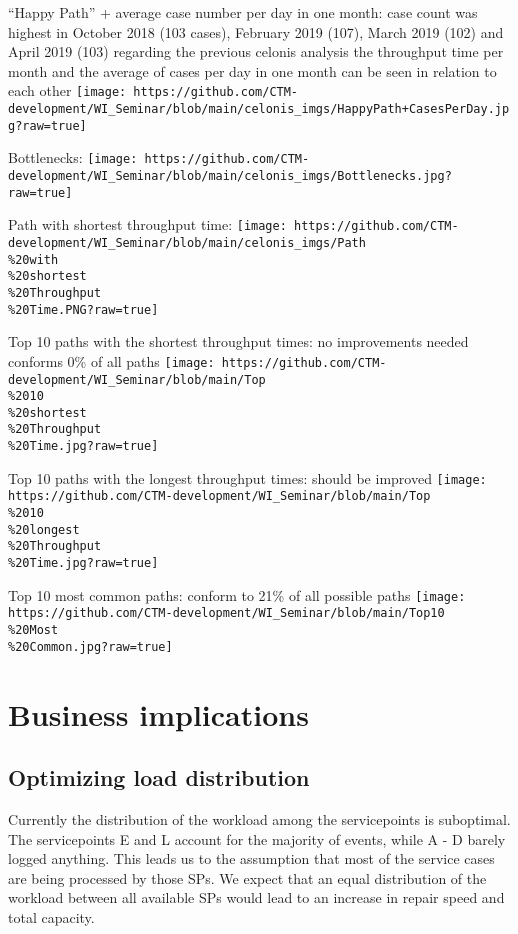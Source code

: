 \documentclass[
]{article}
\begin{document}
``Happy Path'' + average case number per day in one month: case count
was highest in October 2018 (103 cases), February 2019 (107), March 2019
(102) and April 2019 (103) regarding the previous celonis analysis the
throughput time per month and the average of cases per day in one month
can be seen in relation to each other
\texttt{[image: https://github.com/CTM-development/WI\_Seminar/blob/main/celonis\_imgs/HappyPath+CasesPerDay.jpg?raw=true]}

Bottlenecks:
\texttt{[image: https://github.com/CTM-development/WI\_Seminar/blob/main/celonis\_imgs/Bottlenecks.jpg?raw=true]}

Path with shortest throughput time:
\texttt{[image: https://github.com/CTM-development/WI\_Seminar/blob/main/celonis\_imgs/Path\\\%20with\\\%20shortest\\\%20Throughput\\\%20Time.PNG?raw=true]}

Top 10 paths with the shortest throughput times: no improvements needed
conforms 0\% of all paths
\texttt{[image: https://github.com/CTM-development/WI\_Seminar/blob/main/Top\\\%2010\\\%20shortest\\\%20Throughput\\\%20Time.jpg?raw=true]}

Top 10 paths with the longest throughput times: should be improved
\texttt{[image: https://github.com/CTM-development/WI\_Seminar/blob/main/Top\\\%2010\\\%20longest\\\%20Throughput\\\%20Time.jpg?raw=true]}

Top 10 most common paths: conform to 21\% of all possible paths
\texttt{[image: https://github.com/CTM-development/WI\_Seminar/blob/main/Top10\\\%20Most\\\%20Common.jpg?raw=true]}

\hypertarget{business-implications}{%
\section{Business implications}\label{business-implications}}

\hypertarget{optimizing-load-distribution}{%
\subsection{Optimizing load
distribution}\label{optimizing-load-distribution}}

Currently the distribution of the workload among the servicepoints is
suboptimal. The servicepoints E and L account for the majority of
events, while A - D barely logged anything. This leads us to the
assumption that most of the service cases are being processed by those
SPs. We expect that an equal distribution of the workload between all
available SPs would lead to an increase in repair speed and total
capacity.
\end{document}
